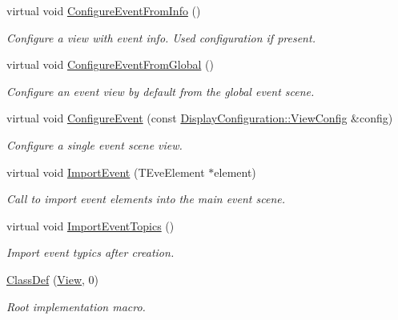\begin{DoxyCompactItemize}
virtual void \hyperlink{class_d_d4hep_1_1_view_a1c4ddbce48cb4e389a8d515a4644773b}{ConfigureEventFromInfo} ()
\begin{DoxyCompactList}\small\item\em Configure a view with event info. Used configuration if present. \item\end{DoxyCompactList}\item 
virtual void \hyperlink{class_d_d4hep_1_1_view_a70d3dfc35cf31c58c5d6e1d1385d1b56}{ConfigureEventFromGlobal} ()
\begin{DoxyCompactList}\small\item\em Configure an event view by default from the global event scene. \item\end{DoxyCompactList}\item 
virtual void \hyperlink{class_d_d4hep_1_1_view_a655dc004a93ab9caa56ee5a501bf492f}{ConfigureEvent} (const \hyperlink{class_d_d4hep_1_1_display_configuration_1_1_view_config}{DisplayConfiguration::ViewConfig} \&config)
\begin{DoxyCompactList}\small\item\em Configure a single event scene view. \item\end{DoxyCompactList}\item 
virtual void \hyperlink{class_d_d4hep_1_1_view_a3fcf261f808c5ed9687f864286309123}{ImportEvent} (TEveElement $\ast$element)
\begin{DoxyCompactList}\small\item\em Call to import event elements into the main event scene. \item\end{DoxyCompactList}\item 
virtual void \hyperlink{class_d_d4hep_1_1_view_a825772febdb79469f13b40dd0acbe03c}{ImportEventTopics} ()
\begin{DoxyCompactList}\small\item\em Import event typics after creation. \item\end{DoxyCompactList}\item 
\hyperlink{class_d_d4hep_1_1_view_a35dcb8a29c90f0adeba81ad4215be551}{ClassDef} (\hyperlink{class_d_d4hep_1_1_view}{View}, 0)
\begin{DoxyCompactList}\small\item\em Root implementation macro. \item\end{DoxyCompactList}\end{DoxyCompactItemize}
